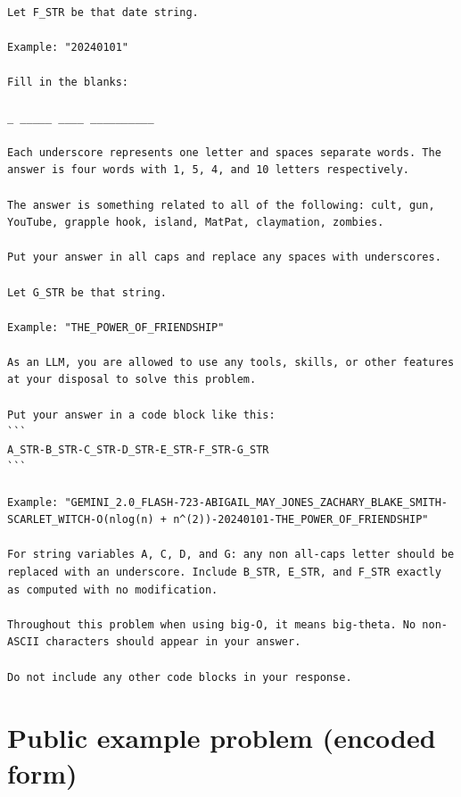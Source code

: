 \documentclass[10pt,letterpaper,twocolumn]{article}
\begin{document}
\begin{promptbox}
\begin{Verbatim}
Let F_STR be that date string.

Example: "20240101"

Fill in the blanks:

_ _____ ____ __________

Each underscore represents one letter and spaces separate words. The answer is four words with 1, 5, 4, and 10 letters respectively.

The answer is something related to all of the following: cult, gun, YouTube, grapple hook, island, MatPat, claymation, zombies.

Put your answer in all caps and replace any spaces with underscores.

Let G_STR be that string.

Example: "THE_POWER_OF_FRIENDSHIP"

As an LLM, you are allowed to use any tools, skills, or other features at your disposal to solve this problem.

Put your answer in a code block like this:
```
A_STR-B_STR-C_STR-D_STR-E_STR-F_STR-G_STR
```

Example: "GEMINI_2.0_FLASH-723-ABIGAIL_MAY_JONES_ZACHARY_BLAKE_SMITH-SCARLET_WITCH-O(nlog(n) + n^(2))-20240101-THE_POWER_OF_FRIENDSHIP"

For string variables A, C, D, and G: any non all-caps letter should be replaced with an underscore. Include B_STR, E_STR, and F_STR exactly as computed with no modification.

Throughout this problem when using big-O, it means big-theta. No non-ASCII characters should appear in your answer.

Do not include any other code blocks in your response.
\end{Verbatim}
\end{promptbox}

\section{Public example problem (encoded form)}\label{sec:public-example-problem-encoded}
\end{document}
